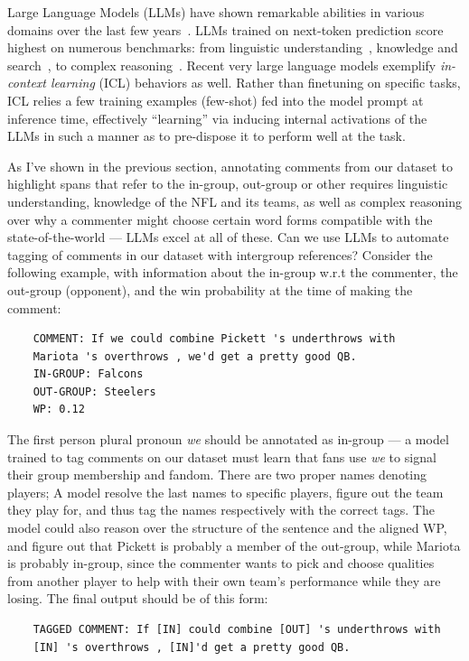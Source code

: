 Large Language Models (LLMs) have shown remarkable abilities in various domains over the last few years~\citep{Brown2020LanguageMA}. LLMs trained on next-token prediction score highest on numerous benchmarks: from linguistic understanding~\citep{srivastava2023beyond}, knowledge and search~\citep{geminiteam2023gemini}, to complex reasoning~\citep{NEURIPS2022_9d560961}. Recent very large language models exemplify \emph{in-context learning} (ICL) behaviors as well. Rather than finetuning on specific tasks, ICL relies a few training examples (few-shot) fed into the model prompt at inference time, effectively ``learning'' via inducing internal activations of the LLMs in such a manner as to pre-dispose it to perform well at the task.

As I've shown in the previous section, annotating comments from our dataset to highlight spans that refer to the in-group, out-group or other requires linguistic understanding, knowledge of the NFL and its teams, as well as complex reasoning over why a commenter might choose certain word forms compatible with the state-of-the-world --- LLMs excel at all of these. Can we use LLMs to automate tagging of comments in our dataset with intergroup references? Consider the following example, with information about the in-group w.r.t the commenter, the out-group (opponent), and the win probability at the time of making the comment:

\begin{verbatim}
    COMMENT: If we could combine Pickett 's underthrows with
    Mariota 's overthrows , we'd get a pretty good QB.
    IN-GROUP: Falcons
    OUT-GROUP: Steelers
    WP: 0.12
\end{verbatim}

The first person plural pronoun \emph{we} should be annotated as in-group --- a model trained to tag comments on our dataset must learn that fans use \emph{we} to signal their group membership and fandom. There are two proper names denoting players; A model resolve the last names to specific players, figure out the team they play for, and thus tag the names respectively with the correct tags. The model could also reason over the structure of the sentence and the aligned WP, and figure out that Pickett is probably a member of the out-group, while Mariota is probably in-group, since the commenter wants to pick and choose qualities from another player to help with their own team's performance while they are losing. The final output should be of this form:

\begin{verbatim}
    TAGGED COMMENT: If [IN] could combine [OUT] 's underthrows with 
    [IN] 's overthrows , [IN]'d get a pretty good QB.
\end{verbatim}

